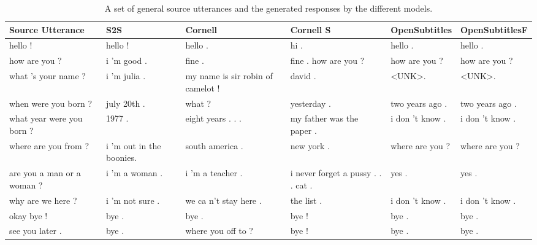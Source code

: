 \documentclass[12pt]{article}
\begin{document}
\begin{table}[H]
	\centering
	\begin{tabular}{|L{2.3cm}|L{2.3cm}|L{2.3cm}|L{2.3cm}|L{2.3cm}|L{2.3cm}|}
		\hline
		\textbf{Source Utterance} & \textbf{S2S} & \textbf{Cornell} & \textbf{Cornell S} & \textbf{OpenSubtitles} & \textbf{OpenSubtitlesF}\\ \hline
		hello ! & hello ! & hello . & hi . & hello . & hello .
		\\ \hline
		how are you ? & i 'm good . & fine . & fine . how are you ? & how are you ? & how are you ?
		\\ \hline
		what 's your name ? & i ’m julia . & my name is sir robin of camelot !  & david . & \textless UNK\textgreater . & \textless UNK\textgreater .
		\\ \hline
		when were you born ? & july 20th . & what ? & yesterday . & two years ago . & two years ago .
		\\ \hline
		what year were you born ? & 1977 . & eight years . . . & my father was the paper . & i don 't know . & i don 't know .
		\\ \hline
		where are you from ? & i ’m out in the boonies. & south america . & new york . & where are you ? & where are you ?
		\\ \hline
		are you a man or a woman ? & i ’m a woman . & i 'm a teacher .  & i never forget a pussy . . . cat . & yes . & yes .
		\\ \hline
		why are we here ? & i ’m not sure . & we ca n't stay here .  & the list . & i don 't know . & i don 't know .
		\\ \hline
		okay bye ! & bye . & bye . & bye ! & bye . & bye .
		\\ \hline
		see you later . & bye . & where you off to ?  & bye ! & bye . & bye .
		\\ \hline
		
	\end{tabular}
	\caption{A set of general source utterances and the generated responses by the different models.}	
	\label{table:basicNCM}
\end{table}
\end{document}
